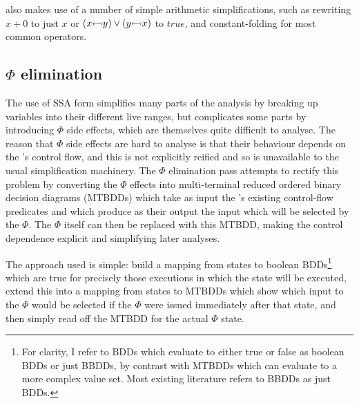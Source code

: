 {\Implementation} also makes use of a number of simple arithmetic
simplifications, such as rewriting $x + 0$ to just $x$ or
$(x {\leftarrowtail} y) \vee (y {\leftarrowtail} x)$ to
$\mathit{true}$, and constant-folding for most common operators.

\subsection{$\Phi$ elimination}
\label{sect:phi_elimination}

The use of SSA form simplifies many parts of the analysis by breaking
up variables into their different live ranges, but complicates some
parts by introducing $\Phi$ side effects, which are themselves quite
difficult to analyse.  The reason that $\Phi$ side effects are hard to
analyse is that their behaviour depends on the {\StateMachine}'s
control flow, and this is not explicitly reified and so is unavailable
to the usual simplification machinery.  The $\Phi$ elimination pass
attempts to rectify this problem by converting the $\Phi$ effects into
multi-terminal reduced ordered binary decision
diagrams\needCite{}  (MTBDDs) which take as input the
{\StateMachine}'s existing control-flow predicates and which produce
as their output the input which will be selected by the $\Phi$.  The
$\Phi$ itself can then be replaced with this MTBDD, making the control
dependence explicit and simplifying later analyses.


The approach used is simple: build a mapping from {\StateMachine}
states to boolean BDDs\footnote{For clarity, I refer to BDDs which
  evaluate to either true or false as boolean BDDs or just BBDDs, by
  contrast with MTBDDs which can evaluate to a more complex value set.
  Most existing literature refers to BBDDs as just BDDs.}  which are
true for precisely those executions in which the state will be
executed, extend this into a mapping from states to MTBDDs which show
which input to the $\Phi$ would be selected if the $\Phi$ were issued
immediately after that state, and then simply read off the MTBDD for
the actual $\Phi$ state.

